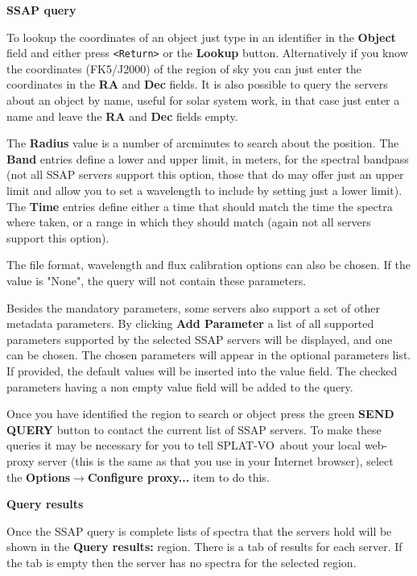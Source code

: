 \documentclass[twoside,11pt]{article}
\newcommand{\latexhtml}[2]{#1}
\renewcommand{\_}{\texttt{\symbol{95}}}
\newcommand{\SPLAT}{\textsf{SPLAT-VO}}
\newcommand{\submenuitem}[2]{\latexhtml{\textbf{#1$\rightarrow$#2}}{\textbf{#1->#2}}}
\newcommand{\labelitem}[1]{\textbf{#1}}
\newcommand{\hitext}[1]{\texttt{#1}}
\newcommand{\subheading}[1]{\textbf{\large{#1}}}
\begin{document}
\subheading{SSAP query}

To lookup the coordinates of an object just type in an identifier in the
\labelitem{Object} field and either press \hitext{<Return>} or the
\labelitem{Lookup} button. Alternatively if you know the coordinates
(FK5/J2000) of the region of sky you can just enter the coordinates in the
\labelitem{RA} and \labelitem{Dec} fields. It is also possible to query
the servers about an object by name, useful for solar system work, in
that case just enter a name and leave the \labelitem{RA} and \labelitem{Dec}
fields empty.

The \labelitem{Radius} value is a number of arcminutes to search about the
position. The \labelitem{Band} entries define a lower and upper limit, in
meters, for the spectral bandpass (not all SSAP servers support this option,
those that do may offer just an upper limit and allow you to set a wavelength
to include by setting just a lower limit).
The \labelitem{Time} entries define either a time that should match the
time the spectra where taken, or a range in which they should match (again
not all servers support this option).

The file format, wavelength and flux calibration options can also be chosen.
If the value is "None", the query will not contain these parameters.

Besides the mandatory parameters, some servers also support a set of other
metadata parameters. By clicking \labelitem{Add Parameter} a list of all
supported parameters supported by the selected SSAP servers will be displayed,
and one can be chosen.  The chosen parameters will appear in the optional
parameters list. If provided, the default values will be inserted into the
value field. The checked parameters having a non empty value field will be
added to the query.

Once you have identified the region to search or object press the green
\labelitem{SEND QUERY} button to contact the current list of SSAP servers. To make
these queries it may be necessary for you to tell \SPLAT\ about your local
web-proxy server (this is the same as that you use in your Internet browser),
select the \submenuitem{Options}{Configure proxy...} item to do this.

\subheading {Query results}

Once the SSAP query is complete lists of spectra that the servers hold will be
shown in the \labelitem{Query results:} region. There is a tab of results for
each server. If the tab is empty then the server has no spectra for the
selected region.
\end{document}
